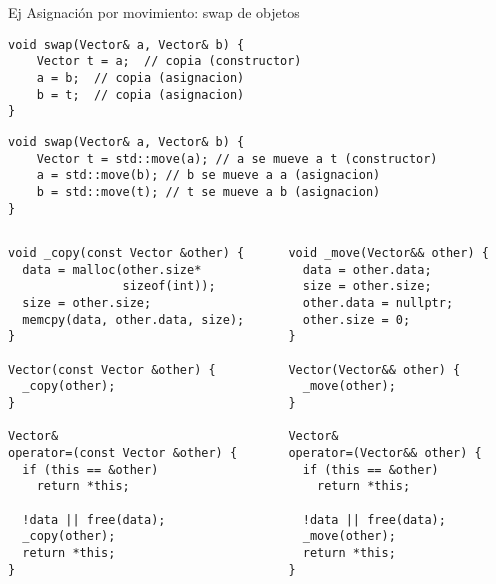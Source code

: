 \begin{frame}[fragile]{Ej Asignaci\'on por movimiento: swap de objetos}{}
        \begin{lstlisting}[style=normal,firstnumber=10]
void swap(Vector& a, Vector& b) {
    Vector t = a;  // copia (constructor)
    a = b;  // copia (asignacion)
    b = t;  // copia (asignacion)
}
        \end{lstlisting}
        \begin{lstlisting}[style=normal,firstnumber=10]
void swap(Vector& a, Vector& b) {
    Vector t = std::move(a); // a se mueve a t (constructor)
    a = std::move(b); // b se mueve a a (asignacion)
    b = std::move(t); // t se mueve a b (asignacion)
}
        \end{lstlisting}
\end{frame}


\begin{frame}{}{}
   \begin{columns}[T]
      \begin{column}{.5\linewidth}
         \begin{lstlisting}[style=normal,numbers=none]
void _copy(const Vector &other) {
  data = malloc(other.size*
                sizeof(int));
  size = other.size;
  memcpy(data, other.data, size);
}

Vector(const Vector &other) {
  _copy(other);
}

Vector& 
operator=(const Vector &other) {
  if (this == &other)
    return *this;

  !data || free(data);
  _copy(other);
  return *this;
}
  
         \end{lstlisting}
      \end{column}
      \begin{column}{.45\linewidth}
         \begin{lstlisting}[style=normal,numbers=none]
void _move(Vector&& other) {
  data = other.data;
  size = other.size;
  other.data = nullptr;
  other.size = 0;
}

Vector(Vector&& other) {
  _move(other);
}

Vector& 
operator=(Vector&& other) {
  if (this == &other)
    return *this;

  !data || free(data);
  _move(other);
  return *this;
}
         \end{lstlisting}
      \end{column}
   \end{columns}
\end{frame}

